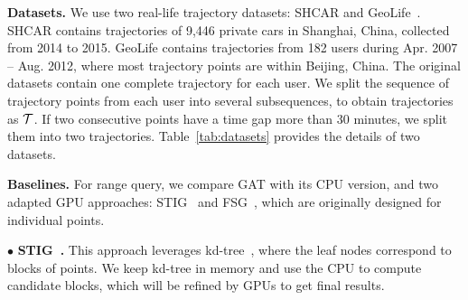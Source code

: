 \documentclass[10pt,conference,letterpaper]{IEEEtran}
\newcommand{\frname}{GAT\xspace }
\newcommand{\alltraj}{{{\cal T}}\xspace}
\begin{document}
\vspace{0.1cm}\textbf{Datasets.}
We use two real-life trajectory datasets: SHCAR and  GeoLife~\cite{DBLP:journals/debu/ZhengXM10}.
SHCAR contains trajectories of 9,446 private cars in Shanghai, China, collected from 2014 to 2015. GeoLife contains trajectories from 182 users during Apr. 2007 -- Aug. 2012, where most trajectory points are within Beijing, China.
%
The original datasets contain one complete trajectory for each user.
We split the sequence of trajectory points from each user into several subsequences, to obtain trajectories as $\alltraj$. If two consecutive points have  a time gap more than 30 minutes, we split them into two trajectories.
Table~\ref{tab:datasets} provides the details of two datasets.



\vspace{0.1cm}\textbf{Baselines.}
For range query, we compare \frname with its CPU version, and two adapted GPU approaches: STIG~\cite{7498315} and FSG~\cite{GPUTaxi}, which are originally designed for individual points.

\vspace{0.1cm}$\bullet$ \textbf{STIG~\cite{7498315}.} This approach leverages kd-tree~\cite{DBLP:journals/cacm/Bentley75}, where the leaf nodes correspond to blocks of points.
We keep kd-tree in memory and use the CPU to compute candidate blocks, which will be refined by GPUs to get final results.
\end{document}
